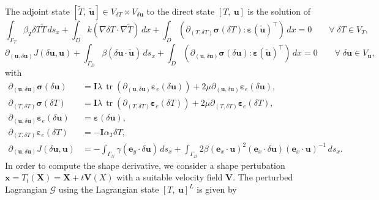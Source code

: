 \documentclass[preview]{standalone}
\let\oldcdot\cdot
\let\cdot\oldcdot
\begin{document}
The adjoint state $\left[ \tilde T, \  \tilde{\mathbf{ u }}\right] \in  V_{\delta T}\times V_{{\delta\mathbf{  u }}}$ to the direct state $\left[ T, \  {\mathbf{ u }}\right]$ is the solution of
\begin{dmath*}
 \int_{\Gamma_{T}} \beta_{T} \delta T \tilde T \,ds_x +  \int_{D} k \left(  \nabla \delta T  \cdot  \nabla \tilde T  \right) \,dx +  \int_{D} \left( \partial_{(T,\delta T)} \pmb \sigma(\delta T) \mathrel{:}  \pmb\varepsilon(\tilde{\mathbf{ u }})^\top  \right) \,dx = 0\qquad \forall\; {\delta T\in V_{T}} , 
\end{dmath*}
\begin{dmath*}
\partial_{({\mathbf{ u }},{\delta\mathbf{  u }})} J({\delta\mathbf{  u }},{\mathbf{ u }}) +  \int_{\Gamma_D} \beta \left( {\delta\mathbf{  u }} \cdot \tilde{\mathbf{ u }} \right) \,ds_x +  \int_{D} \left( \partial_{({\mathbf{ u }},{\delta\mathbf{  u }})} \pmb \sigma({\delta\mathbf{  u }}) \mathrel{:}  \pmb\varepsilon(\tilde{\mathbf{ u }})^\top  \right) \,dx = 0\qquad \forall\; {{\delta\mathbf{  u }}\in V_{{\mathbf{ u }}}} , 
\end{dmath*}
with 
\begin{align*}
\partial_{({\mathbf{ u }},{\delta\mathbf{  u }})} \pmb \sigma({\delta\mathbf{  u }}) &= \mathbf{I} \lambda  \,\operatorname{tr}\left(\partial_{({\mathbf{ u }},{\delta\mathbf{  u }})} \pmb\varepsilon_e({\delta\mathbf{  u }})\right)  + 2 \mu \partial_{({\mathbf{ u }},{\delta\mathbf{  u }})} \pmb\varepsilon_e({\delta\mathbf{  u }}),\\
\partial_{(T,\delta T)} \pmb \sigma(\delta T) &= \mathbf{I} \lambda  \,\operatorname{tr}\left(\partial_{(T,\delta T)} \pmb\varepsilon_e(\delta T)\right)  + 2 \mu \partial_{(T,\delta T)} \pmb\varepsilon_e(\delta T),\\
\partial_{({\mathbf{ u }},{\delta\mathbf{  u }})} \pmb\varepsilon_e({\delta\mathbf{  u }}) &= \pmb\varepsilon({\delta\mathbf{  u }}),\\
\partial_{(T,\delta T)} \pmb\varepsilon_e(\delta T) &= - \mathbf{I} \alpha_{T} \delta T,\\
\partial_{({\mathbf{ u }},{\delta\mathbf{  u }})} J({\delta\mathbf{  u }},{\mathbf{ u }}) &= -  \int_{\Gamma_N} \gamma \left( \mathbf e_y \cdot {\delta\mathbf{  u }} \right) \,ds_x +  \int_{\Gamma_D} 2 \beta \left( \mathbf e_x \cdot {\mathbf{ u }} \right)^{2} \left( \mathbf e_x \cdot {\delta\mathbf{  u }} \right) \left( \mathbf e_x \cdot {\mathbf{ u }} \right)^{-1} \,ds_x.
 \end{align*}
In order to compute the shape derivative, we consider a shape pertubation $\mathbf x = T_t(\mathbf X) = \mathbf X + t \mathbf  V(X)$ with a suitable velocity field $\mathbf V$. The perturbed Lagrangian $\mathcal G$ using the Lagrangian state $\left[ T, \  {\mathbf{ u }}\right]^{L}$ is given by
\end{document}
